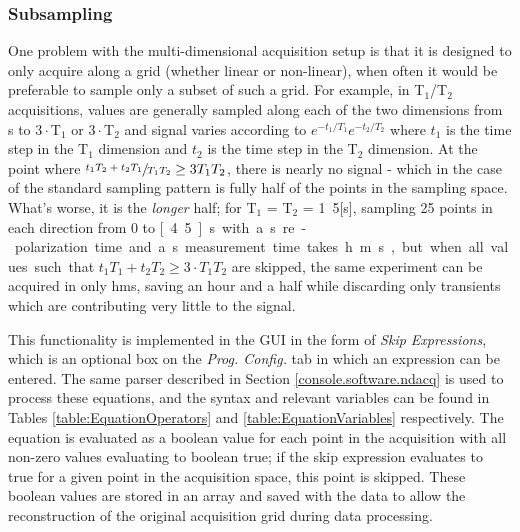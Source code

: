 \documentclass[PaulGanssle-Thesis.tex]{subfiles}
\begin{document}
\subsubsection{Subsampling}
\label{Section:Console-Subsampling}
One problem with the multi-dimensional acquisition setup is that it is designed to only acquire along a grid (whether linear or non-linear), when often it would be preferable to sample only a subset of such a grid. For example, in T$_1$/T$_2$ acquisitions, values are generally sampled along each of the two dimensions from \unit[0]{s} to $3\cdot$T$_1$ or $3\cdot$T$_2$ and signal varies according to $e^{-t_{1}/T_{1}}e^{-t_{2}/T_{2}}$ where $t_{1}$ is the time step in the T$_{1}$ dimension and $t_{2}$ is the time step in the T$_{2}$ dimension. At the point where $\sfrac{t_{1}T_{2}+t_{2}T_{1}}{T_{1}T_{2}} \geq 3T_{1}T_{2}$, there is nearly no signal - which in the case of the standard sampling pattern is fully half of the points in the sampling space. What's worse, it is the \textit{longer} half; for T$_{1}$ = T$_{2}$ = \unit{1.5}[s], sampling 25 points in each direction from 0 to \unit[4.5]{s} with a \unit[10]{s} re-polarization time and a \unit[2]{s} measurement time takes \unit[2]{h}\unit[51]{m}\unit[53]{s}, but when all values such that $t_{1}T_{1}+t_{2}T_{2} \geq 3\cdot{}T_{1}T_{2}$ are skipped, the same experiment can be acquired in only \unit[1]{h}\unit[21]{m}\unit[15]{s}, saving an hour and a half while discarding only transients which are contributing very little to the signal.

This functionality is implemented in the GUI in the form of \textit{Skip Expressions}, which is an optional box on the \textit{Prog. Config.} tab in which an expression can be entered. The same parser described in Section \ref{console.software.ndacq} is used to process these equations, and the syntax and relevant variables can be found in Tables \ref{table:EquationOperators} and \ref{table:EquationVariables} respectively.  The equation is evaluated as a boolean value for each point in the acquisition with all non-zero values evaluating to boolean true; if the skip expression evaluates to true for a given point in the acquisition space, this point is skipped. These boolean values are stored in an array and saved with the data to allow the reconstruction of the original acquisition grid during data processing.
\end{document}

